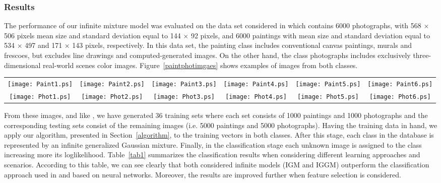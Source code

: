 \documentclass[journal,10pt]{elsart}
\begin{document}
\subsubsection{Results}
The performance of our infinite mixture model was evaluated on the data set considered in \cite{Cutzu2003,Cutzu2005} which contains 6000 photographs, with 568 $\times$ 506 pixels mean size and standard deviation equal to 144 $\times$ 92 pixels, and 6000 paintings with mean size and standard deviation equal to 534 $\times$ 497 and 171 $\times$ 143 pixels, respectively. In this data set, the painting class includes conventional canvas paintings, murals and frescoes, but excludes line drawings and computed-generated images. On the other hand, the class photographs includes exclusively three-dimensional real-world scenes color images. Figure~\ref{paintphotimgaes} shows examples of images from both classes.
\begin{figure*}[!ht]
\begin{center}
\begin{tabular}{cccccc}
 \texttt{[image: Paint1.ps]}
&
\texttt{[image: Paint2.ps]}
&
\texttt{[image: Paint3.ps]}
&
\texttt{[image: Paint4.ps]}
&
\texttt{[image: Paint5.ps]}
&
\texttt{[image: Paint6.ps]}
\\
 \texttt{[image: Phot1.ps]}
&
\texttt{[image: Phot2.ps]}
&
\texttt{[image: Phot3.ps]}
&
\texttt{[image: Phot4.ps]}
&
\texttt{[image: Phot5.ps]}
&
\texttt{[image: Phot6.ps]}
\end{tabular}
\caption{Sample images from each group. Row 1: Paintings, Row 2: Photographs.} \label{paintphotimgaes}
\end{center}
\end{figure*}
From these images, and like \cite{Cutzu2003,Cutzu2005}, we have generated 36 training sets where each set consists of 1000 paintings and 1000 photographs and the corresponding testing sets consist of the remaining images (i.e. 5000 paintings and 5000 photographs). Having the training data in hand, we apply our algorithm, presented in Section~\ref{algorithm}, to the training vectors in both classes. After this stage, each class in the database is represented by an infinite generalized Gaussian mixture. Finally, in the classification stage each unknown image is assigned to the class increasing more its loglikelihood. Table~\ref{tab1} summarizes the classification results when considering different learning approaches and scenarios. According to this table, we can see clearly that both considered infinite models (IGM and IGGM) outperform the classification approach used in \cite{Cutzu2003,Cutzu2005} and based on neural networks. Moreover, the results are improved further when feature selection is considered.
\end{document}
